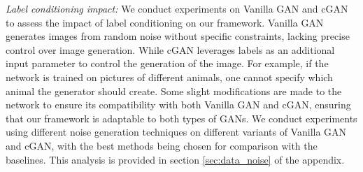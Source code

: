 \documentclass[letterpaper]{article}
\begin{document}

\textit{Label conditioning impact:} We conduct experiments on Vanilla GAN \cite{GAN} and cGAN \cite{CGAN} to assess the impact of label conditioning on our framework. Vanilla GAN generates images from random noise without specific constraints, lacking precise control over image generation. While cGAN leverages labels as an additional input parameter to control the generation of the image. For example, if the network is trained on pictures of different animals, one cannot specify which animal the generator should create.
Some slight modifications are made to the network to ensure its compatibility with both Vanilla GAN and cGAN, ensuring that our framework is adaptable to both types of GANs. We conduct experiments using different noise generation techniques on different variants of Vanilla GAN and cGAN, with the best methods being chosen for comparison with the baselines. This analysis is provided in section \ref{sec:data_noise} of the appendix.
\end{document}
